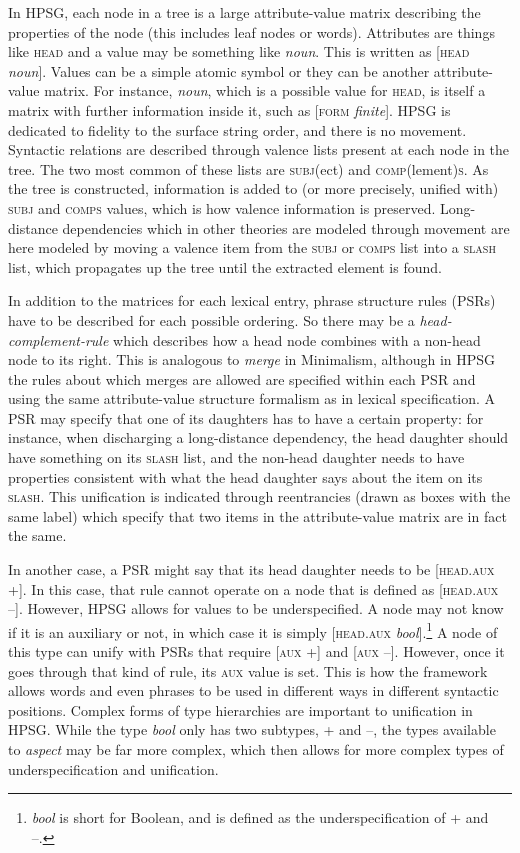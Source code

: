In HPSG, each node in a tree is a large attribute-value matrix describing the properties of the node (this includes leaf nodes or words). Attributes are things like \textsc{head} and a value may be something like \textit{noun}. This is written as [\textsc{head} \textit{noun}]. Values can be a simple atomic symbol or they can be another attribute-value matrix. For instance, \textit{noun}, which is a possible value for \textsc{head}, is itself a matrix with further information inside it, such as [\textsc{form} \textit{finite}]. HPSG is dedicated to fidelity to the surface string order, and there is no movement. Syntactic relations are described through valence lists present at each node in the tree. The two most common of these lists are \textsc{subj}(ect) and \textsc{comp}(lement)\textsc{s}. As the tree is constructed, information is added to (or more precisely, unified with) \textsc{subj} and \textsc{comps} values, which is how valence information is preserved. Long-distance dependencies which in other theories are modeled through movement are here modeled by moving a valence item from the \textsc{subj} or \textsc{comps} list into a \textsc{slash} list, which propagates up the tree until the extracted element is found.

In addition to the matrices for each lexical entry, phrase structure rules (PSRs) have to be described for each possible ordering. So there may be a {\textit{head-complement-rule}} which describes how a head node combines with a non-head node to its right. This is analogous to \textit{merge} in Minimalism, although in HPSG the rules about which merges are allowed are specified within each PSR and using the same attribute-value structure formalism as in lexical specification. A PSR may specify that one of its daughters has to have a certain property: for instance, when discharging a long-distance dependency, the head daughter should have something on its \textsc{slash} list, and the non-head daughter needs to have properties consistent with what the head daughter says about the item on its \textsc{slash}. This unification is indicated through reentrancies (drawn as boxes with the same label) which specify that two items in the attribute-value matrix are in fact the same.

In another case, a PSR might say that its head daughter needs to be [\textsc{head.aux} +]. In this case, that rule cannot operate on a node that is defined as [\textsc{head.aux} --]. However, HPSG allows for values to be underspecified. A node may not know if it is an auxiliary or not, in which case it is simply [\textsc{head.aux} \textit{bool}].\footnote{\textit{bool} is short for Boolean, and is defined as the underspecification of + and --.} A node of this type can unify with PSRs that require [\textsc{aux} +] and [\textsc{aux} --]. However, once it goes through that kind of rule, its \textsc{aux} value is set. This is how the framework allows words and even phrases to be used in different ways in different syntactic positions. Complex forms of type hierarchies are important to unification in HPSG. While the type \textit{bool} only has two subtypes, + and --, the types available to \textit{aspect} may be far more complex, which then allows for more complex types of underspecification and unification.

